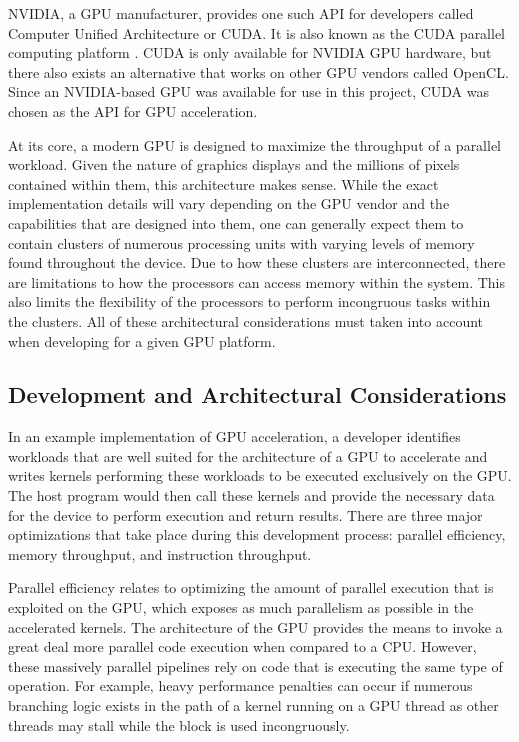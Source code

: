 \documentclass[conference, twoside]{IEEEtran}
\begin{document}
NVIDIA, a GPU manufacturer, provides one such API for developers called Computer Unified Architecture or CUDA. It is also known as the CUDA parallel computing platform \cite{nvidia-cuda}. CUDA is only available for NVIDIA GPU hardware, but there also exists an alternative that works on other GPU vendors called OpenCL. Since an NVIDIA-based GPU was available for use in this project, CUDA was chosen as the API for GPU acceleration.

At its core, a modern GPU is designed to maximize the throughput of a parallel workload. Given the nature of graphics displays and the millions of pixels contained within them, this architecture makes sense. While the exact implementation details will vary depending on the GPU vendor and the capabilities that are designed into them, one can generally expect them to contain clusters of numerous processing units with varying levels of memory found throughout the device. Due to how these clusters are interconnected, there are limitations to how the processors can access memory within the system. This also limits the flexibility of the processors to perform incongruous tasks within the clusters. All of these architectural considerations must taken into account when developing for a given GPU platform.

\subsection{Development and Architectural Considerations} %

In an example implementation of GPU acceleration, a developer identifies workloads that are well suited for the architecture of a GPU to accelerate and writes kernels performing these workloads to be executed exclusively on the GPU. The host program would then call these kernels and provide the necessary data for the device to perform execution and return results. There are three major optimizations that take place during this development process: parallel efficiency, memory throughput, and instruction throughput.

Parallel efficiency relates to optimizing the amount of parallel execution that is exploited on the GPU, which exposes as much parallelism as possible in the accelerated kernels. The architecture of the GPU provides the means to invoke a great deal more parallel code execution when compared to a CPU. However, these massively parallel pipelines rely on code that is executing the same type of operation. For example, heavy performance penalties can occur if numerous branching logic exists in the path of a kernel running on a GPU thread as other threads may stall while the block is used incongruously.
\end{document}
